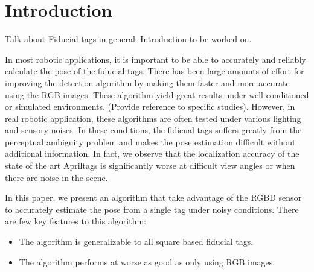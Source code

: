 \section{Introduction}
\label{sec:intro}
Talk about Fiducial tags in general. Introduction to be worked on.

In most robotic applications, it is important to be able to accurately and reliably calculate the pose of the fiducial tags. There has been large amounts of effort for improving the detection algorithm by making them faster and more accurate using the RGB images. These algorithm yield great results under well conditioned or simulated environments. (Provide reference to specific studies). However, in real robotic application, these algorithms are often tested under various lighting and sensory noises. In these conditions, the fidicual tags suffers greatly from the perceptual ambiguity problem and makes the pose estimation difficult without additional information. In fact, we observe that the localization accuracy of the state of the art Apriltags is significantly worse at difficult view angles or when there are noise in the scene. 

In this paper, we present an algorithm that take advantage of the RGBD sensor to accurately estimate the pose from a single tag under noisy conditions. There are few key features to this algorithm: 
\begin{itemize}
\item The algorithm is generalizable to all square based fiducial tags.
\item The algorithm performs at worse as good as only using RGB images.
\end{itemize}